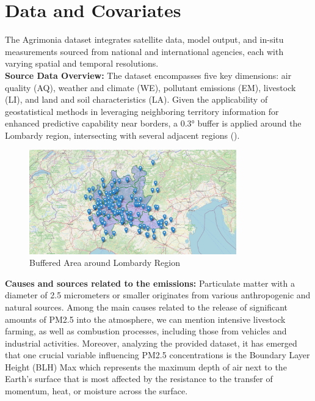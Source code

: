 \documentclass[12pt,a4paper]{article}
\begin{document}
\section{Data and Covariates}
The Agrimonia dataset integrates satellite data, model output, and in-situ measurements sourced from national and international agencies, each with varying spatial and temporal resolutions. 
\\
\textbf{Source Data Overview:}
The dataset encompasses five key dimensions: air quality (AQ), weather and climate (WE), pollutant emissions (EM), livestock (LI), and land and soil characteristics (LA). Given the applicability of geostatistical methods in leveraging neighboring territory information for enhanced predictive capability near borders, a 0.3° buffer is applied around the Lombardy region, intersecting with several adjacent regions ().

\begin{figure}
    \centering
    
    \includegraphics[width=0.8\textwidth]{./imgs/maps/mappa.png}
    \caption{Buffered Area around Lombardy Region}
    \label{fig:buffered_area}
\end{figure}
\textbf{Causes and sources related to the emissions:}
Particulate matter with a diameter of 2.5 micrometers or smaller originates from various anthropogenic and natural sources. Among the main causes related to the release of significant amounts of PM2.5 into the atmosphere, we can mention intensive livestock farming, as well as combustion processes, including those from vehicles and industrial activities.
Moreover, analyzing the provided dataset, it has emerged that one crucial variable influencing PM2.5 concentrations is the Boundary Layer Height (BLH) Max which represents the maximum depth of air next to the Earth's surface that is most affected by the resistance to the transfer of momentum, heat, or moisture across the surface. 
\end{document}
